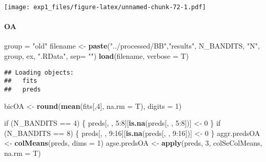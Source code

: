 \documentclass[11pt,,]{article}
\newenvironment{Shaded}{\begin{snugshade}}{\end{snugshade}}
\newcommand{\KeywordTok}[1]{\textcolor[rgb]{0.13,0.29,0.53}{\textbf{{#1}}}}
\newcommand{\DataTypeTok}[1]{\textcolor[rgb]{0.13,0.29,0.53}{{#1}}}
\newcommand{\DecValTok}[1]{\textcolor[rgb]{0.00,0.00,0.81}{{#1}}}
\newcommand{\StringTok}[1]{\textcolor[rgb]{0.31,0.60,0.02}{{#1}}}
\newcommand{\NormalTok}[1]{{#1}}
\let\oldparagraph\paragraph
\renewcommand{\paragraph}[1]{\oldparagraph{#1}\mbox{}}
\begin{document}
\texttt{[image: exp1\_files/figure-latex/unnamed-chunk-72-1.pdf]}

\newpage

\paragraph{OA}\label{oa}

\begin{Shaded}
\begin{Highlighting}[]
\NormalTok{group =}\StringTok{ "old"}
\NormalTok{filename  <-}\StringTok{ }\KeywordTok{paste}\NormalTok{(}\StringTok{"../processed/BB"}\NormalTok{,}\StringTok{"results"}\NormalTok{, N_BANDITS, }\StringTok{"N"}\NormalTok{, }
                   \NormalTok{group, ex, }\StringTok{".RData"}\NormalTok{, }\DataTypeTok{sep=} \StringTok{""}\NormalTok{)}
\KeywordTok{load}\NormalTok{(filename, }\DataTypeTok{verbose =} \NormalTok{T)}
\end{Highlighting}
\end{Shaded}

\begin{verbatim}
## Loading objects:
##   fits
##   preds
\end{verbatim}

\begin{Shaded}
\begin{Highlighting}[]
\NormalTok{bicOA <-}\StringTok{ }\KeywordTok{round}\NormalTok{(}\KeywordTok{mean}\NormalTok{(fits[,}\DecValTok{4}\NormalTok{], }\DataTypeTok{na.rm =} \NormalTok{T), }\DataTypeTok{digits =} \DecValTok{1}\NormalTok{)}

\NormalTok{if (N_BANDITS ==}\StringTok{ }\DecValTok{4}\NormalTok{) \{}
    \NormalTok{preds[, , }\DecValTok{5}\NormalTok{:}\DecValTok{8}\NormalTok{][}\KeywordTok{is.na}\NormalTok{(preds[, , }\DecValTok{5}\NormalTok{:}\DecValTok{8}\NormalTok{])] <-}\StringTok{ }\DecValTok{0}
\NormalTok{\}}
\NormalTok{if (N_BANDITS ==}\StringTok{ }\DecValTok{8}\NormalTok{) \{}
    \NormalTok{preds[, , }\DecValTok{9}\NormalTok{:}\DecValTok{16}\NormalTok{][}\KeywordTok{is.na}\NormalTok{(preds[, , }\DecValTok{9}\NormalTok{:}\DecValTok{16}\NormalTok{])] <-}\StringTok{ }\DecValTok{0}
\NormalTok{\}}
\NormalTok{aggr.predsOA <-}\StringTok{ }\KeywordTok{colMeans}\NormalTok{(preds, }\DataTypeTok{dims =} \DecValTok{1}\NormalTok{) }
\NormalTok{agse.predsOA <-}\StringTok{ }\KeywordTok{apply}\NormalTok{(preds, }\DecValTok{3}\NormalTok{, colSeColMeans, }\DataTypeTok{na.rm =} \NormalTok{T) }
\end{Highlighting}
\end{Shaded}
\end{document}
